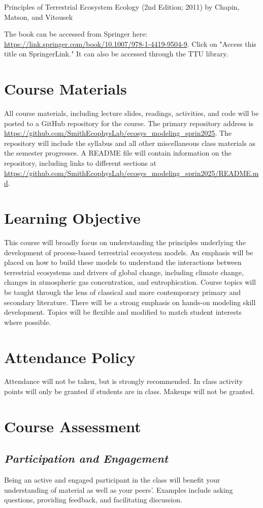 \documentclass[12pt, notitlepage]{article}   	%
\begin{document}
{Principles of Terrestrial Ecosystem Ecology (2nd Edition; 2011) 
by Chapin, Matson, and Vitousek \par
The book can be accessed from Springer here: 
\url{https://link.springer.com/book/10.1007/978-1-4419-9504-9}. Click on "Access this title on 
SpringerLink." It can also be accessed through the TTU library.

\section{Course Materials}
All course materials, including lecture slides, readings, activities, and code 
will be posted to a GitHub repository for the course.
The primary repository address is
\url{https://github.com/SmithEcophysLab/ecosys_modeling_sprin2025}.
The repository will include the syllabus and all other miscellaneous class materials as the semester
progresses. A README file will contain information on the repository, including
links to different sections at 
\url{https://github.com/SmithEcophysLab/ecosys_modeling_sprin2025/README.md}.

\section{Learning Objective}
This course will broadly focus on understanding the principles underlying the development of
process-based terrestrial ecosystem models. An emphasis will be placed on how to build these
models to understand the interactions between terrestrial ecosystems and drivers of global
change, including climate change, changes in atmospheric gas concentration, and eutrophication.
Course topics will be taught through the lens of classical and more contemporary 
primary and secondary literature. There will be a strong emphasis on hands-on modeling skill
development. Topics will be flexible and modified to match student interests where possible.

\section{Attendance Policy}
Attendance will not be taken, but is strongly recommended. 
In class activity points will only be granted if students are in class.
Makeups will not be granted.

\section{Course Assessment}
\subsection{\textit{Participation and Engagement}}
Being an active and engaged participant in the class will benefit your understanding
of material as well as your peers'. Examples include asking questions, providing feedback,
and facilitating discussion.

}
\end{document}
